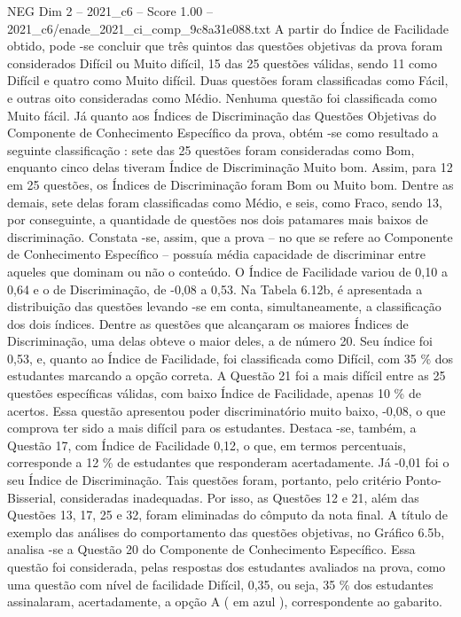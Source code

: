 \begin{textsample}{NEG Dim 2 – 2021\_c6 – Score 1.00 – 2021\_c6/enade\_2021\_ci\_comp\_9c8a31e088.txt}
A partir do Índice de Facilidade obtido, pode -se concluir que três quintos das questões objetivas da prova foram considerados Difícil ou Muito difícil, 15 das 25 questões válidas, sendo 11 como Difícil e quatro como Muito difícil.
Duas questões foram classificadas como Fácil, e outras oito consideradas como Médio.
Nenhuma questão foi classificada como Muito fácil.
Já quanto aos Índices de Discriminação das Questões Objetivas do Componente de Conhecimento Específico da prova, obtém -se como resultado a seguinte classificação : sete das 25 questões foram consideradas como Bom, enquanto cinco delas tiveram Índice de Discriminação Muito bom.
Assim, para 12 em 25 questões, os Índices de Discriminação foram Bom ou Muito bom.
Dentre as demais, sete delas foram classificadas como Médio, e seis, como Fraco, sendo 13, por conseguinte, a quantidade de questões nos dois patamares mais baixos de discriminação.
Constata -se, assim, que a prova – no que se refere ao Componente de Conhecimento Específico – possuía média capacidade de discriminar entre aqueles que dominam ou não o conteúdo.
O Índice de Facilidade variou de 0,10 a 0,64 e o de Discriminação, de -0,08 a 0,53.
Na Tabela 6.12b, é apresentada a distribuição das questões levando -se em conta, simultaneamente, a classificação dos dois índices.
Dentre as questões que alcançaram os maiores Índices de Discriminação, uma delas obteve o maior deles, a de número 20.
Seu índice foi 0,53, e, quanto ao Índice de Facilidade, foi classificada como Difícil, com 35 \% dos estudantes marcando a opção correta.
A Questão 21 foi a mais difícil entre as 25 questões específicas válidas, com baixo Índice de Facilidade, apenas 10 \% de acertos.
Essa questão apresentou poder discriminatório muito baixo, -0,08, o que comprova ter sido a mais difícil para os estudantes.
Destaca -se, também, a Questão 17, com Índice de Facilidade 0,12, o que, em termos percentuais, corresponde a 12 \% de estudantes que responderam acertadamente.
Já -0,01 foi o seu Índice de Discriminação.
Tais questões foram, portanto, pelo critério Ponto-Bisserial, consideradas inadequadas.
Por isso, as Questões 12 e 21, além das Questões 13, 17, 25 e 32, foram eliminadas do cômputo da nota final.
A título de exemplo das análises do comportamento das questões objetivas, no Gráfico 6.5b, analisa -se a Questão 20 do Componente de Conhecimento Específico.
Essa questão foi considerada, pelas respostas dos estudantes avaliados na prova, como uma questão com nível de facilidade Difícil, 0,35, ou seja, 35 \% dos estudantes assinalaram, acertadamente, a opção A ( em azul ), correspondente ao gabarito.

\end{textsample}
